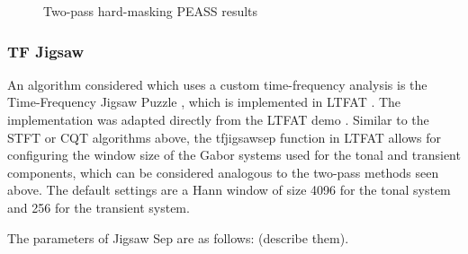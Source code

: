 \documentclass[letter,12pt]{article}
\begin{document}
\begin{figure}[ht]
	\centering
	\vspace{-1.25em}
	\caption{Two-pass hard-masking PEASS results}
	\label{fig:round2hard}
\end{figure}

\subsubsection{TF Jigsaw}

An algorithm considered which uses a custom time-frequency analysis is the Time-Frequency Jigsaw Puzzle \cite{tfjigsaw}, which is implemented in LTFAT \cite{tfjigsaw2}. The implementation was adapted directly from the LTFAT demo \cite{tfjigsaw3}. Similar to the STFT or CQT algorithms above, the tfjigsawsep function in LTFAT allows for configuring the window size of the Gabor systems used for the tonal and transient components, which can be considered analogous to the two-pass methods seen above. The default settings are a Hann window of size 4096 for the tonal system and 256 for the transient system.

The parameters of Jigsaw Sep are as follows: (describe them).
\end{document}
